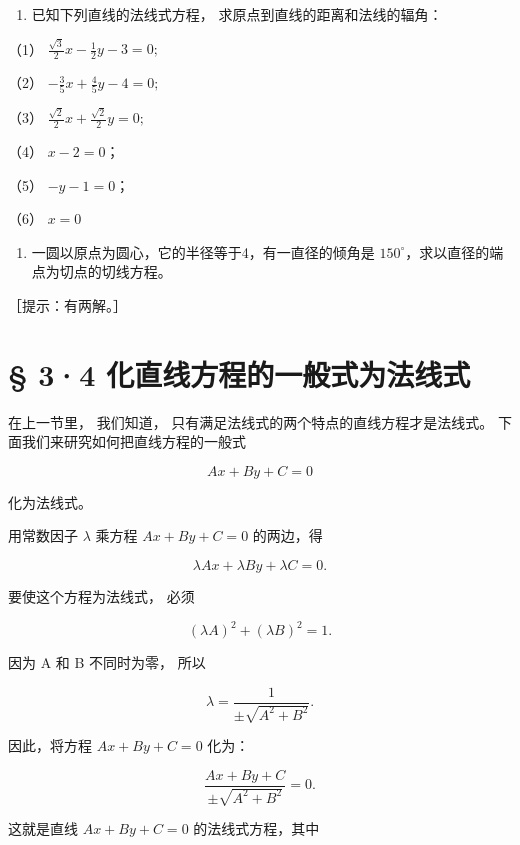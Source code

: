 \begin{enumerate}
\def\labelenumi{\arabic{enumi}.}
\setcounter{enumi}{2}
\tightlist
\item
  已知下列直线的法线式方程， 求原点到直线的距离和法线的辐角：
\end{enumerate}

（1） \(\frac{\sqrt{3}}{2} x - \frac{1}{2} y - 3 = 0;\)

（2） \(-\frac{3}{5} x + \frac{4}{5} y - 4 = 0;\)

（3） \(\frac{\sqrt{2}}{2} x + \frac{\sqrt{2}}{2} y = 0;\)

（4） \(x - 2 = 0\)；

（5） \(-y - 1 = 0\)；

（6） \(x = 0\)

\begin{enumerate}
\def\labelenumi{\arabic{enumi}.}
\setcounter{enumi}{3}
\tightlist
\item
  一圆以原点为圆心，它的半径等于4，有一直径的倾角是
  \(150^{\circ}\)，求以直径的端点为切点的切线方程。
\end{enumerate}

［提示：有两解。］

\section{§ 3·4
化直线方程的一般式为法线式}\label{ux5316ux76f4ux7ebfux65b9ux7a0bux7684ux4e00ux822cux5f0fux4e3aux6cd5ux7ebfux5f0f}

在上一节里， 我们知道， 只有满足法线式的两个特点的直线方程才是法线式。
下面我们来研究如何把直线方程的一般式

\[
A x + B y + C = 0
\]

化为法线式。

用常数因子 \(\lambda\) 乘方程 \(Ax + By + C = 0\) 的两边，得

\[
\lambda A x + \lambda B y + \lambda C = 0.
\]

要使这个方程为法线式， 必须

\[
(\lambda A) ^ {2} + (\lambda B) ^ {2} = 1.
\]

因为 A 和 B 不同时为零， 所以

\[
\lambda = \frac {1}{\pm \sqrt {A^{2} + B^{2}}}.
\]

因此，将方程 \(Ax + By + C = 0\) 化为：

\[
\boxed {\frac {A x + B y + C}{\pm \sqrt {A^{2} + B^{2}}} = 0.}
\]

这就是直线 \(Ax + By + C = 0\) 的法线式方程，其中

